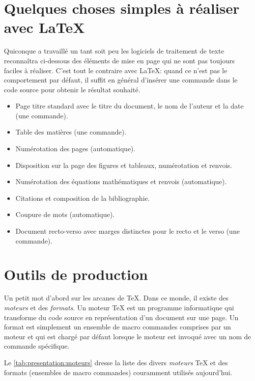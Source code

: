 \section{Quelques choses simples à réaliser avec {\LaTeX}}

Quiconque a travaillé un tant soit peu les logiciels de traitement de
texte reconnaîtra ci-dessous des éléments de mise en page qui ne sont
pas toujours faciles à réaliser. C'est tout le contraire avec
{\LaTeX}: quand ce n'est pas le comportement par défaut, il suffit en
général d'insérer une commande dans le code source pour obtenir le
résultat souhaité.

\begin{itemize}
\item Page titre standard avec le titre du document, le nom de
  l'auteur et la date (une commande).
\item Table des matières (une commande).
\item Numérotation des pages (automatique).
\item Disposition sur la page des figures et tableaux, numérotation et
  renvois.
\item Numérotation des équations mathématiques et renvois (automatique).
\item Citations et composition de la bibliographie.
\item Coupure de mots (automatique).
\item Document recto-verso avec marges distinctes pour le recto et le
  verso (une commande).
\end{itemize}


\section{Outils de production}

Un petit mot d'abord sur les arcanes de {\TeX}. Dans ce monde, il
existe des \emph{moteurs} et des \emph{formats}. Un moteur {\TeX} est
un programme informatique qui transforme du code source en
représentation d'un document sur une page. Un format est simplement un
ensemble de macro commandes comprises par un moteur et qui est chargé
par défaut lorsque le moteur est invoqué avec un nom de commande
spécifique.

Le \autoref{tab:presentation:moteurs} dresse la liste des divers
\emph{moteurs} {\TeX} et des formats (ensembles de macro commandes)
couramment utilisés aujourd'hui.

